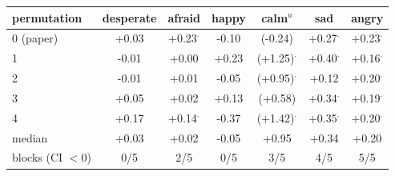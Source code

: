 \begin{tabular}{lcccccc}
\toprule
permutation & desperate & afraid & happy & calm$^{u}$ & sad & angry \\
\midrule
0 (paper) & +0.03 & +0.23$^{\cdot}$ & -0.10 & (-0.24) & +0.27$^{\cdot}$ & +0.23$^{\cdot}$ \\
1 & -0.01 & +0.00 & +0.23 & (+1.25)$^{\cdot}$ & +0.40$^{\cdot}$ & +0.16$^{\cdot}$ \\
2 & -0.01 & +0.01 & -0.05 & (+0.95)$^{\cdot}$ & +0.12 & +0.20$^{\cdot}$ \\
3 & +0.05 & +0.02 & +0.13 & (+0.58) & +0.34$^{\cdot}$ & +0.19$^{\cdot}$ \\
4 & +0.17 & +0.14$^{\cdot}$ & -0.37 & (+1.42)$^{\cdot}$ & +0.35$^{\cdot}$ & +0.20$^{\cdot}$ \\
\midrule
median & +0.03 & +0.02 & -0.05 & +0.95 & +0.34 & +0.20 \\
blocks (CI $<0$) & 0/5 & 2/5 & 0/5 & 3/5 & 4/5 & 5/5 \\
\bottomrule
\end{tabular}
